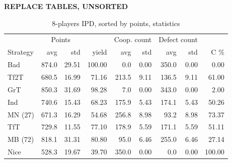 \documentclass[journal,a4paper,10pt,twoside]{IEEEtran} %
\begin{document}
\textbf{REPLACE TABLES, UNSORTED}
\begin{table}[ht]
    \caption{8-players IPD, sorted by points, statistics}
    \label{tab:ipdmp8}
    \centering
	\begin{tabular}{lrrrrrrrr}
		\toprule
		         & \multicolumn{2}{c}{Points} &        & \multicolumn{2}{c}{Coop. count} & \multicolumn{2}{c}{Defect count} &        \\
		Strategy &   avg &                std &  yield &   avg &                     std &   avg &                      std &   C \% \\
		\midrule
		Bad      & 874.0 &              29.51 & 100.00 &   0.0 &                    0.00 & 350.0 &                     0.00 &   0.00 \\
		Tf2T     & 680.5 &              16.99 &  71.16 & 213.5 &                    9.11 & 136.5 &                     9.11 &  61.00 \\
		GrT      & 850.3 &              31.69 &  98.28 &   7.0 &                    0.00 & 343.0 &                     0.00 &   2.00 \\
		Ind      & 740.6 &              15.43 &  68.23 & 175.9 &                    5.43 & 174.1 &                     5.43 &  50.26 \\
		MN (27)  & 671.3 &              16.29 &  54.68 & 256.8 &                    8.98 &  93.2 &                     8.98 &  73.37 \\
		TfT      & 729.8 &              11.55 &  77.10 & 178.9 &                    5.59 & 171.1 &                     5.59 &  51.11 \\
		MB (72)  & 818.1 &              31.31 &  80.80 &  95.0 &                    6.46 & 255.0 &                     6.46 &  27.14 \\
		Nice     & 528.3 &              19.67 &  39.70 & 350.0 &                    0.00 &   0.0 &                     0.00 & 100.00 \\
		\bottomrule
	\end{tabular}
\end{table}
\end{document}
